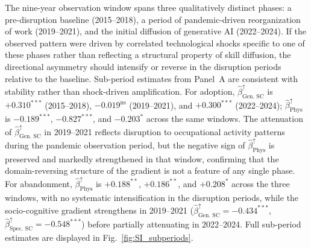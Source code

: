 \documentclass[11pt, letterpaper]{article} %
\begin{document}
The nine-year observation window spans three qualitatively distinct phases: a pre-disruption baseline (2015--2018), a period of pandemic-driven reorganization of work (2019--2021), and the initial diffusion of generative AI (2022--2024). If the observed pattern were driven by correlated technological shocks specific to one of these phases rather than reflecting a structural property of skill diffusion, the directional asymmetry should intensify or reverse in the disruption periods relative to the baseline. Sub-period estimates from Panel~A are consistent with stability rather than shock-driven amplification. For adoption, $\hat{\beta}^{\uparrow}_{\text{Gen. SC}}$ is $+0.310^{***}$ (2015--2018), $-0.019^{\text{ns}}$ (2019--2021), and $+0.300^{***}$ (2022--2024); $\hat{\beta}^{\uparrow}_{\text{Phys}}$ is $-0.189^{***}$, $-0.827^{***}$, and $-0.203^{*}$ across the same windows. The attenuation of $\hat{\beta}^{\uparrow}_{\text{Gen. SC}}$ in 2019--2021 reflects disruption to occupational activity patterns during the pandemic observation period, but the negative sign of $\hat{\beta}^{\uparrow}_{\text{Phys}}$ is preserved and markedly strengthened in that window, confirming that the domain-reversing structure of the gradient is not a feature of any single phase. For abandonment, $\hat{\beta}^{\uparrow}_{\text{Phys}}$ is $+0.188^{**}$, $+0.186^{**}$, and $+0.208^{*}$ across the three windows, with no systematic intensification in the disruption periods, while the socio-cognitive gradient strengthens in 2019--2021 ($\hat{\beta}^{\uparrow}_{\text{Gen. SC}} = -0.434^{***}$, $\hat{\beta}^{\uparrow}_{\text{Spec. SC}} = -0.548^{***}$) before partially attenuating in 2022--2024. Full sub-period estimates are displayed in Fig.~\ref{fig:SI_subperiods}.
 

 
\end{document}
